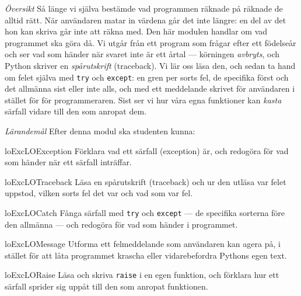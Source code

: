 \emph{Översikt}
Så länge vi själva bestämde vad programmen räknade på räknade de alltid
rätt.  När användaren matar in värdena går det inte längre: en del av
det hon kan skriva går inte att räkna med.  Den här modulen handlar om
vad programmet ska göra då.  Vi utgår från ett program som frågar efter
ett födelseår och ser vad som händer när svaret inte är ett årtal ---
körningen \emph{avbryts}, och Python skriver en \emph{spårutskrift}
(\foreignlanguage{english}{traceback}).  Vi
lär oss läsa den, och sedan ta hand om felet själva med
\texttt{try} och \texttt{except}: en gren per
sorts fel, de specifika först och det allmänna sist eller inte alls,
och med ett meddelande skrivet för användaren i stället för för
programmeraren.  Sist ser vi hur våra egna funktioner kan \emph{kasta}
särfall vidare till den som anropat dem.

\emph{Lärandemål}
Efter denna modul ska studenten kunna:
\begin{restatable}{lo}{ExcLOException}\label{ExcLOException}%
  Förklara vad ett särfall (\foreignlanguage{english}{exception}) är,
  och redogöra för vad som händer när ett särfall inträffar.
\end{restatable}
\begin{restatable}{lo}{ExcLOTraceback}\label{ExcLOTraceback}%
  Läsa en spårutskrift (\foreignlanguage{english}{traceback}) och ur
  den utläsa var felet uppstod, vilken sorts
  fel det var och vad som var fel.
\end{restatable}
\begin{restatable}{lo}{ExcLOCatch}\label{ExcLOCatch}%
  Fånga särfall med \texttt{try} och
  \texttt{except} --- de specifika sorterna före den
  allmänna --- och redogöra för vad som händer i programmet.
\end{restatable}
\begin{restatable}{lo}{ExcLOMessage}\label{ExcLOMessage}%
  Utforma ett felmeddelande som användaren kan agera på, i stället för
  att låta programmet krascha eller vidarebefordra Pythons egen text.
\end{restatable}
\begin{restatable}{lo}{ExcLORaise}\label{ExcLORaise}%
  Läsa och skriva \texttt{raise} i en egen funktion, och
  förklara hur ett särfall sprider sig uppåt till den som anropat
  funktionen.
\end{restatable}

